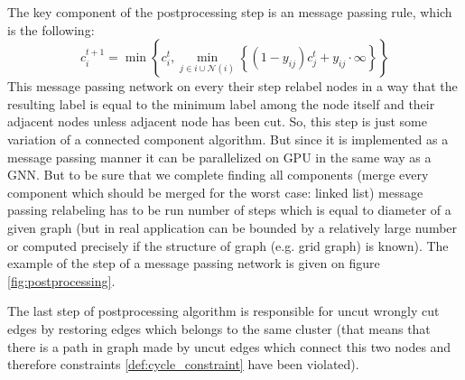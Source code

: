 \documentclass[10pt, twocolumn, a4paper]{article}
\theoremstyle{definition}
\begin{document}
\begin{figure*}[h]
    \caption{Illustration of the step of the message passing postprocessing network: colors and labels in nodes corresponds to the
        cluster of nodes: same color and label -- same cluster. Black edges is a uncut edges of the original graph $G$ and
        \textcolor{gray!80}{gray} -- cut edges of $G$. After a message passing step 3 nodes which have been connected by uncut edges
        changed their labels to the minimal label among the neighborhood. At the same time the node with label 4 didn't changed their label
        because it is not connected by uncut edge to any node with smaller label on this step. Also we denote with \textcolor{blue}{blue} color edge that became
        incident to nodes from the same cluster and therefore
        on the last step of the postprocessing algorithm will be restored.} \label{fig:postprocessing}
\end{figure*}

The key component of the postprocessing step is an message passing rule, which is the following:
\begin{equation} \label{def:postprocessing_mpn}
    c_i^{t+1} = \min \left\{ c_i^{t}, \min\limits_{j \in i \cup \mathcal{N}(i)} \left\{ (1 - y_{ij})c_j^{t} + y_{ij} \cdot \infty \right\}  \right\}
\end{equation}
This message passing network on every their step relabel nodes in a way that the resulting label is
equal to the minimum label among the node itself and their adjacent nodes unless adjacent node has been cut.
So, this step is just some variation of a connected component algorithm. But since it is implemented as a message passing
manner it can be parallelized on GPU in the same way as a GNN. But to be sure that we complete finding
all components (merge every component which should be merged for the worst case: linked list) message passing
relabeling has to be run number of steps which is equal to diameter of a given graph (but in real application can
be bounded by a relatively large number or computed precisely if the structure of graph (e.g. grid graph)
is known). The example of the step of a message passing network is given on figure \ref{fig:postprocessing}.

The last step of postprocessing algorithm is responsible for uncut wrongly cut edges by restoring edges
which belongs to the same cluster (that means that there is a path in graph made by uncut edges which
connect this two nodes and therefore constraints \eqref{def:cycle_constraint} have been violated).
\end{document}
